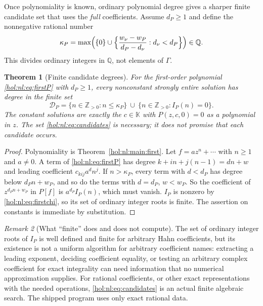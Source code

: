 \documentclass[11pt]{article}
\numberwithin{equation}{section}
\newtheorem{theorem}{Theorem}[section]
\theoremstyle{definition}
\theoremstyle{remark}
\newtheorem{remark}[theorem]{Remark}
\newcommand{\Q}{\mathbb Q}
\newcommand{\Z}{\mathbb Z}
\newcommand{\KK}{\mathbb K}
\begin{document}
Once polynomiality is known, ordinary polynomial degree gives a sharper
finite candidate set that uses the \emph{full} coefficients. Assume $d_P\ge1$
and define the nonnegative rational number
\begin{equation}\label{hol:nl:eq:kappa}
 \kappa_P=\max\Bigl(\{0\}\cup\Bigl\{\frac{w_\nu-w_P}{d_P-d_\nu}:d_\nu<d_P\Bigr\}\Bigr)\in\Q.
\end{equation}
This divides ordinary integers in $\Q$, not elements of $\Gamma$.

\begin{theorem}[Finite candidate degrees]\label{hol:nl:thm:degrees}
For the first-order polynomial \eqref{hol:nl:eq:firstP} with $d_P\ge1$, every
nonconstant strongly entire solution has degree in the finite set
\begin{equation}\label{hol:nl:eq:candidates}
 \mathcal D_P=\{n\in\Z_{>0}:n\le\kappa_P\}\ \cup\ \{n\in\Z_{>0}:I_P(n)=0\}.
\end{equation}
The constant solutions are exactly the $c\in\KK$ with $P(z,c,0)=0$ as a
polynomial in $z$. The set \eqref{hol:nl:eq:candidates} is necessary; it does
not promise that each candidate occurs.
\end{theorem}

\begin{proof}
Polynomiality is Theorem~\ref{hol:nl:main:first}. Let $f=az^n+\cdots$ with
$n\ge1$ and $a\ne0$. A term of \eqref{hol:nl:eq:firstP} has degree
$k+in+j(n-1)=dn+w$ and leading coefficient $c_{kij}a^dn^j$. If $n>\kappa_P$,
every term with $d<d_P$ has degree below $d_Pn+w_P$, and so do the terms with
$d=d_P$, $w<w_P$. So the coefficient of $z^{d_Pn+w_P}$ in $P[f]$ is
$a^{d_P}I_P(n)$, which must vanish. $I_P$ is nonzero by
\eqref{hol:nl:eq:firstchi}, so its set of ordinary integer roots is finite.
The assertion on constants is immediate by substitution.
\end{proof}

\begin{remark}[What ``finite'' does and does not compute]
The set of ordinary integer roots of $I_P$ is well defined and finite for
arbitrary Hahn coefficients, but its existence is not a uniform algorithm for
arbitrary coefficient names: extracting a leading exponent, deciding
coefficient equality, or testing an arbitrary complex coefficient for exact
integrality can need information that no numerical approximation supplies.
For rational coefficients, or other exact representations with the needed
operations, \eqref{hol:nl:eq:candidates} is an actual finite algebraic
search. The shipped program uses only exact rational data.
\end{remark}
\end{document}

